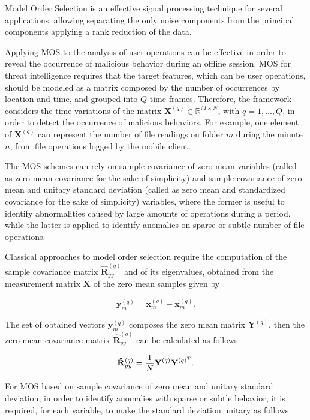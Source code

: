\documentclass[twocolumn]{svjour3}          	%
\begin{document}
Model Order Selection is an effective signal processing technique for several applications, allowing separating the only noise components from the principal components applying a rank reduction of the data. 

Applying MOS to the analysis of user operations can be effective in order to reveal the occurrence of malicious behavior during an offline session. MOS for threat intelligence requires that the target features, which can be user operations, should be modeled as a matrix composed by the number of occurrences by location and time, and grouped into $Q$ time frames. Therefore, the framework considers the time variations of the matrix $\mathbf{X}^{(q)} \in \mathbb{R}^{M\times{N}}$, with $q = 1, \ldots, Q$, in order to detect the occurrence of malicious behaviors. For example, one element of $\mathbf{X}^{(q)}$ can represent the number of file readings on folder $m$ during the minute $n$, from file operations logged by the mobile client.

The MOS schemes can rely on sample covariance of zero mean variables (called as zero mean covariance for the sake of simplicity) and sample covariance of zero mean and unitary standard deviation (called as zero mean and standardized covariance for the sake of simplicity) variables, where the former is useful to identify abnormalities caused by large amounts of operations during a period, while the latter is applied to identify anomalies on sparse or subtle number of file operations.

Classical approaches to model order selection require the computation of the sample covariance matrix $\mathbf{\hat{R}}_{yy}^{(q)}$ and of its eigenvalues, obtained from the measurement matrix $\mathbf{X}$ of the zero mean samples given by

\begin{equation}\label{eq:eq03}
\mathbf{y}_{m}^{(q)} = \mathbf{x}_{m}^{(q)} - \bar{\mathbf{x}}_{m}^{(q)}.
\end{equation}

The set of obtained vectors $\mathbf{y}_{m}^{(q)}$ composes the zero mean matrix $\mathbf{Y}^{(q)}$, then the zero mean covariance matrix $\mathbf{\hat{R}}_{yy}^{(q)}$ can be calculated as follows

\begin{equation}\label{eq:eq04}
\mathbf{\hat{R}}_{yy}^{(q)} = \frac{1}{N}\mathbf{Y}^{(q)}\mathbf{Y}^{(q)^{\rm T}}.
\end{equation}

For MOS based on sample covariance of zero mean and unitary standard deviation, in order to identify anomalies with sparse or subtle behavior, it is required, for each variable, to make the standard deviation unitary as follows
\end{document}
